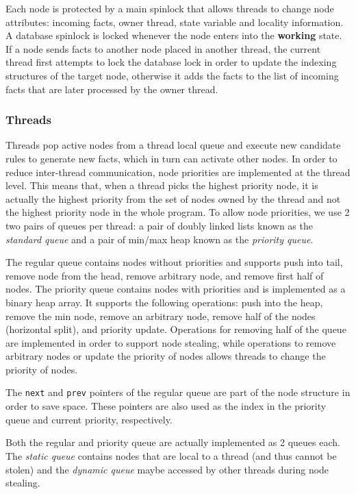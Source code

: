 Each node is protected by a main spinlock that allows threads to change node
attributes: incoming facts, owner thread, state variable and locality information.
A database spinlock is locked whenever the node enters into
the \textbf{working} state. If a node sends facts to another node placed in
another thread, the current thread first attempts to lock the database lock in order to update the
indexing structures of the target node, otherwise it adds the facts to the list of
incoming facts that are later processed by the owner thread.

\subsubsection{Threads}

Threads pop active nodes from a thread local queue and execute new candidate rules to
generate new facts, which in turn can activate other nodes.
In order to reduce inter-thread communication, node priorities are implemented
at the thread level. This means that, when a thread picks the highest
priority node, it is actually the highest priority from the set of nodes owned
by the thread and not the highest priority node in the whole program.
To allow node priorities, we use 2 two pairs of queues per thread: a pair of doubly linked
lists known as the \emph{standard queue} and a pair of min/max heap known as the \emph{priority queue}.

The regular queue contains nodes without priorities and
supports push into tail, remove node from the head, remove arbitrary node, and
remove first half of nodes.
The priority queue contains nodes with priorities and is implemented as a binary
heap array. It supports the following operations: push into the heap, remove the min node,
remove an arbitrary node, remove half of the nodes (horizontal split), and
priority update.
Operations for removing half of the queue are implemented in order to support
node stealing, while operations to remove arbitrary nodes or update the
priority of nodes allows threads to change the priority of nodes.

The \texttt{next} and \texttt{prev} pointers of the regular queue are part of
the node structure in order to save space. These pointers are also used as the
index in the priority queue and current priority, respectively.

Both the regular and priority queue are actually implemented as 2 queues each.
The \emph{static queue} contains nodes that are local to a thread (and thus cannot be stolen) and
the \emph{dynamic queue} maybe accessed by other threads during node stealing.


